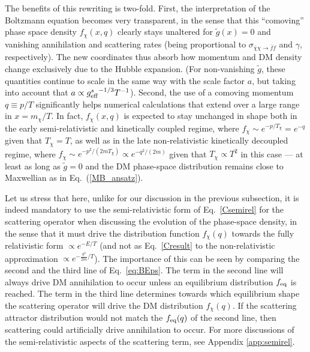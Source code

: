 \documentclass[twocolumn,showpacs,amsmath,amssymb,superscriptaddress,nofootinbib]{revtex4-1}
\begin{document}
The benefits of this rewriting is two-fold.  First, the interpretation of the Boltzmann equation becomes very transparent, 
in the sense that this ``comoving'' phase space density $f_\chi(x,q)$ clearly stays unaltered for  $\tilde g(x) = 0$ and 
vanishing annihilation and scattering rates (being proportional to  $\sigma_{\bar\chi\chi\rightarrow \bar f f} $ and 
$\gamma$, respectively). The new coordinates thus absorb how momentum and DM density 
change exclusively due to the Hubble expansion. (For non-vanishing $\tilde g$, these quantities continue 
to scale in the same way with the scale factor $a$, but taking into account that $a \propto {g_{\rm eff}^s}^{-1/3}T^{-1}$).  
Second, the use of a comoving momentum $q \equiv p/T$ significantly helps numerical calculations that extend over a 
large range in $x=m_\chi/T$.  In fact, $f_\chi(x,q)$ is expected to stay unchanged in shape both in the early 
semi-relativistic and kinetically coupled regime, where $f_\chi \sim e^{-p/T_\chi} = e^{-q}$ given that $T_\chi = T$,  
as well as in the 
late non-relativistic kinetically decoupled regime, where $f_\chi \sim e^{-p^2/(2m T_\chi)}  \propto e^{-q^2/(2m)}$ 
given that $T_\chi \propto T^2$ in this case
--- at least as long as $\tilde g =0$ and the DM phase-space distribution remains close to 
Maxwellian as in Eq.~(\ref{MB_ansatz}). 

Let us stress that here, unlike for our discussion in the previous subsection, it is indeed mandatory to use the 
semi-relativistic form of Eq.~\eqref{Csemirel} for the scattering 
operator when discussing the evolution of the phase-space density, in the sense that it must drive the distribution 
function $f_\chi(q)$ towards the fully relativistic form  $\propto e^{-E/T}$ (and not as Eq.~\eqref{Cresult} to the 
non-relativistic approximation 
$\propto e^{-\frac{q^2}{2m}/{T}}$). 
The importance of this can 
be seen by comparing the second and the third line of Eq.~\eqref{eq:BEps}. The term in the second line will 
always drive DM  annihilation to occur unless an equilibrium distribution $f_{\rm eq}$ is reached.  The term in the 
third line determines towards which 
equilibrium shape the scattering operator will drive the DM distribution $f_\chi(q)$. If the scattering attractor 
distribution would not match the $f_{\rm eq}(q)$ of the second line, then scattering could artificially drive annihilation to 
occur. For more discussions of the semi-relativistic aspects of the scattering term, see Appendix \ref{app:semirel}.
\end{document}
